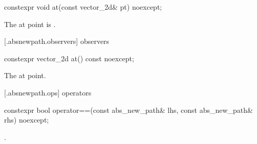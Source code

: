 %
\begin{itemdecl}
constexpr void at(const vector_2d& pt) noexcept;
\end{itemdecl}
\begin{itemdescr}
\pnum
\effects
The at point is .
\end{itemdescr}

 [\iotwod.absnewpath.observers]{ observers}%

%
\begin{itemdecl}
constexpr vector_2d at() const noexcept;
\end{itemdecl}
\begin{itemdescr}
\pnum
\returns
The at point.
\end{itemdescr}

 [\iotwod.absnewpath.ops]{ operators}%

%
\begin{itemdecl}
constexpr bool operator==(const abs_new_path& lhs, const abs_new_path& rhs) 
  noexcept;
\end{itemdecl}
\begin{itemdescr}
\pnum
\returns
{}.
\end{itemdescr}

